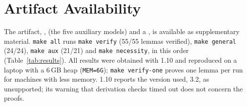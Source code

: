 \section*{Artifact Availability}

The artifact, ,  (the five auxiliary models) and
a , is available as supplementary material.
\texttt{make all} runs \texttt{make verify} (55/55 lemmas verified), \texttt{make general}
(24/24), \texttt{make aux} (21/21) and \texttt{make necessity}, in this order
(Table~\ref{tab:results}). All results were obtained with \tamarin{} 1.10 and reproduced on a
laptop with a 6\,GB heap (\texttt{MEM=6G}); \texttt{make verify-one} proves one lemma per run for machines with less
memory. \tamarin{} 1.10 reports the \maude{} version used, 3.2, as unsupported; its warning that derivation
checks timed out does not concern the proofs.
